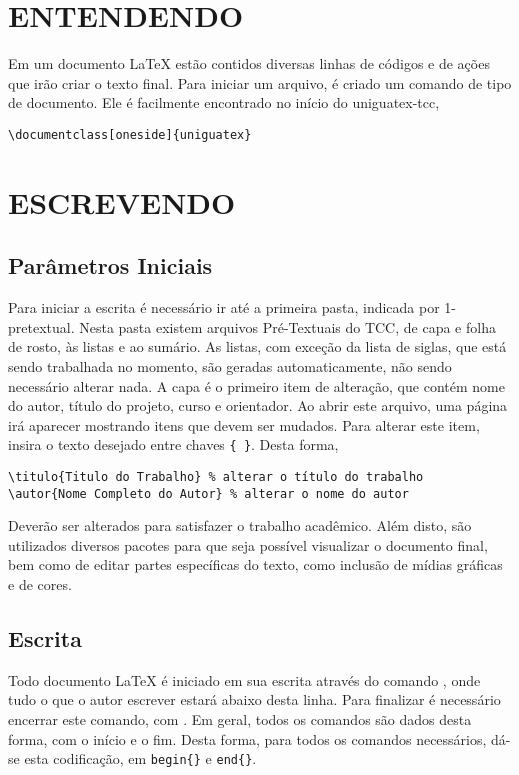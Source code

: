 \section{ENTENDENDO}
\label{entendendo}
Em um documento LaTeX estão contidos diversas linhas de códigos e de ações que irão criar o texto final.
Para iniciar um arquivo, é criado um comando de tipo de documento. Ele é facilmente encontrado no início do uniguatex-tcc,
\begin{verbatim}
\documentclass[oneside]{uniguatex}
\end{verbatim}

\section{ESCREVENDO}
\label{escrevendo}

\subsection{Parâmetros Iniciais}
\label{parametrosiniciais}
Para iniciar a escrita é necessário ir até a primeira pasta, indicada por 1-pretextual. Nesta pasta existem arquivos Pré-Textuais do TCC, de capa e folha de rosto, às listas e ao sumário. As listas, com exceção da lista de siglas, que está sendo trabalhada no momento, são geradas automaticamente, não sendo necessário alterar nada.
A capa é o primeiro item de alteração, que contém nome do autor, título do projeto, curso e orientador. Ao abrir este arquivo, uma página irá aparecer mostrando itens que devem ser mudados. Para alterar este item, insira o texto desejado entre chaves \verb|{ }|. Desta forma,

\begin{verbatim}
\titulo{Titulo do Trabalho} % alterar o título do trabalho
\autor{Nome Completo do Autor} % alterar o nome do autor
\end{verbatim}

Deverão ser alterados para satisfazer o trabalho acadêmico.
Além disto, são utilizados diversos pacotes para que seja possível visualizar o documento final, bem como de editar partes específicas do texto, como inclusão de mídias gráficas e de cores.

\subsection{Escrita}
\label{escrita}

Todo documento LaTeX é iniciado em sua escrita através do comando \verb||, onde tudo o que o autor escrever estará abaixo desta linha. Para finalizar é necessário encerrar este comando, com \verb||.
Em geral, todos os comandos são dados desta forma, com o início e o fim. Desta forma, para todos os comandos necessários, dá-se esta codificação, em \verb|begin{}| e \verb|end{}|.

